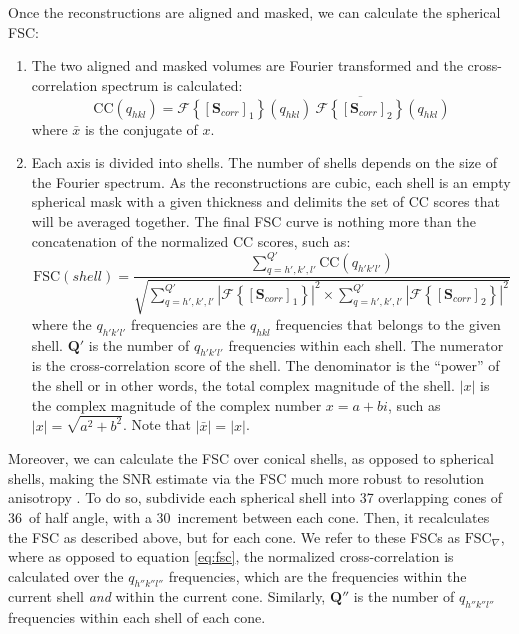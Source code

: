 Once the reconstructions are aligned and masked, we can calculate the spherical FSC:
\begin{enumerate}
    \item The two aligned and masked volumes are Fourier transformed and the cross-correlation spectrum is calculated:
    \begin{equation}  \label{eq:fsc_cc}
        \bm{\mathrm{CC}}(q_{hkl}) = \mathcal{F} \left\{ {[\bm{S}_{corr}]}_1 \right\} (q_{hkl})\ \overline{ \mathcal{F} \left\{ {[\bm{S}_{corr}]}_2 \right\} }(q_{hkl})
    \end{equation}
    where $\bar{x}$ is the conjugate of $x$.
    \item Each axis is divided into shells. The number of shells depends on the size of the Fourier spectrum. As the reconstructions are cubic, each shell is an empty spherical mask with a given thickness and delimits the set of $\bm{\mathrm{CC}}$ scores that will be averaged together. The final FSC curve is nothing more than the concatenation of the normalized $\bm{\mathrm{CC}}$ scores, such as:
    \begin{equation} \label{eq:fsc}
        \bm{\mathrm{FSC}}(shell) = \frac{ \sum\limits_{q=h',k',l'}^{Q'} \bm{\mathrm{CC}}(q_{h'k'l'}) }{ 
                                          \sqrt{ \sum\limits_{q=h',k',l'}^{Q'} {|\mathcal{F} \left\{ {[\bm{S}_{corr}]}_1 \right\}|}^2 \times
                                                 \sum\limits_{q=h',k',l'}^{Q'} {|\mathcal{F}\left\{ {[\bm{S}_{corr}]}_2 \right\}|}^2 } }
    \end{equation}
    where the $q_{h'k'l'}$ frequencies are the $q_{hkl}$ frequencies that belongs to the given shell. $\bm{Q}'$ is the number of $q_{h'k'l'}$ frequencies within each shell. The numerator is the cross-correlation score of the shell. The denominator is the ``power'' of the shell or in other words, the total complex magnitude of the shell. $|x|$ is the complex magnitude of the complex number $x = a+bi$, such as $|x| = \sqrt{a^2 + b^2}$. Note that $|\bar{x}| = |x|$.
\end{enumerate}

Moreover, we can calculate the FSC over conical shells, as opposed to spherical shells, making the SNR estimate via the FSC much more robust to resolution anisotropy \cite{conical_fsc}. To do so, {\emClarity} subdivide each spherical shell into 37 overlapping cones of 36\textdegree\ of half angle, with a 30\textdegree\ increment between each cone. Then, it recalculates the FSC as described above, but for each cone. We refer to these FSCs as $\bm{\mathrm{FSC}}_{\nabla}$, where as opposed to equation \ref{eq:fsc}, the normalized cross-correlation is calculated over the $q_{h''k''l''}$ frequencies, which are the frequencies within the current shell \emph{and} within the current cone. Similarly, $\bm{Q}''$ is the number of $q_{h''k''l''}$ frequencies within each shell of each cone.

